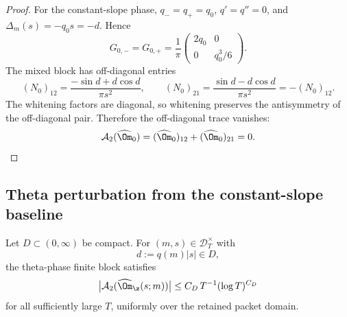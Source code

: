 \begin{proof}
For the constant-slope phase, \(q_-=q_+=q_0\), \(q'=q''=0\), and
\(\Delta_m(s)=-q_0s=-d\).  Hence
\[
G_{0,-}=G_{0,+}=\frac1\pi
\begin{pmatrix}
2q_0&0\\
0&q_0^3/6
\end{pmatrix}.
\]
The mixed block has off-diagonal entries
\[
(N_0)_{12}=\frac{-\sin d+d\cos d}{\pi s^2},
\qquad
(N_0)_{21}=\frac{\sin d-d\cos d}{\pi s^2}=-(N_0)_{12}.
\]
The whitening factors are diagonal, so whitening preserves the antisymmetry
of the off-diagonal pair.  Therefore the off-diagonal trace vanishes:
\[
\mathcal A_2(\widehat\Om_0)=
(\widehat\Om_0)_{12}+(\widehat\Om_0)_{21}=0.
\]
\end{proof}

\subsection{Theta perturbation from the constant-slope baseline}
\label{subsec:theta-perturbation-two-point}

\begin{lemma}
\label{lem:theta-two-point-scalar-perturbation}
Let \(D\subset(0,\infty)\) be compact.  For \((m,s)\in\mathcal D_T^\times\)
with
\begin{equation}
\label{eq:theta-two-point-d-constraint}
        d:=q(m)|s|\in D,
\end{equation}
the theta-phase finite block satisfies
\begin{equation}
\label{eq:theta-two-point-perturbation-bound}
        \bigl|\mathcal A_2(\widehat\Om_\z(s;m))\bigr|
        \le C_D\,T^{-1}(\log T)^{C_D}
\end{equation}
for all sufficiently large \(T\), uniformly over the retained packet domain.
\end{lemma}

